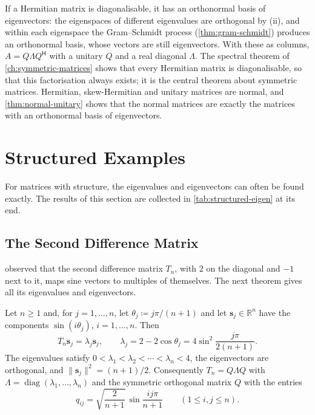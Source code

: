 If a Hermitian matrix is diagonalisable, it has an orthonormal basis of eigenvectors: the eigenspaces of different eigenvalues are orthogonal by (ii), and within each eigenspace the Gram--Schmidt process (\cref{thm:gram-schmidt}) produces an orthonormal basis, whose vectors are still eigenvectors. With these as columns, $A=Q\Lambda Q^{\mathsf H}$ with a unitary $Q$ and a real diagonal $\Lambda$. The spectral theorem of \cref{ch:symmetric-matrices} shows that every Hermitian matrix is diagonalisable, so that this factorisation always exists; it is the central theorem about symmetric matrices. Hermitian, skew-Hermitian and unitary matrices are normal, and \cref{thm:normal-unitary} shows that the normal matrices are exactly the matrices with an orthonormal basis of eigenvectors.

\section{Structured Examples}
\label{sec:structured-eigen}

For matrices with structure, the eigenvalues and eigenvectors can often be found exactly. The results of this section are collected in \cref{tab:structured-eigen} at its end.

\subsection{The Second Difference Matrix}

 observed that the second difference matrix $T_n$, with $2$ on the diagonal and $-1$ next to it, maps sine vectors to multiples of themselves. The next theorem gives all its eigenvalues and eigenvectors.

\begin{theorem}
\label{thm:second-difference-eigen}
Let $n\ge1$ and, for $j=1,\ldots,n$, let $\theta_j\coloneqq j\pi/(n+1)$ and let $\mathbf s_j\in\mathbb R^n$ have the components $\sin(i\theta_j)$, $i=1,\ldots,n$. Then
\[
T_n\mathbf s_j=\lambda_j\mathbf s_j,\qquad\lambda_j=2-2\cos\theta_j=4\sin^2\frac{j\pi}{2(n+1)} .
\]
The eigenvalues satisfy $0<\lambda_1<\lambda_2<\cdots<\lambda_n<4$, the eigenvectors are orthogonal, and $\|\mathbf s_j\|^2=(n+1)/2$. Consequently $T_n=Q\Lambda Q$ with $\Lambda=\operatorname{diag}(\lambda_1,\ldots,\lambda_n)$ and the symmetric orthogonal matrix $Q$ with the entries
\[
q_{ij}=\sqrt{\frac2{n+1}}\,\sin\frac{ij\pi}{n+1}\qquad(1\le i,j\le n).
\]
\end{theorem}

